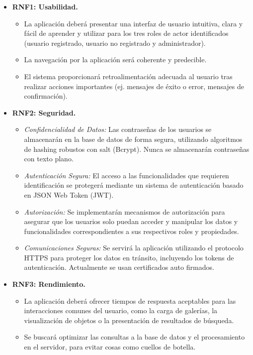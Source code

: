 \begin{itemize}
    \item \textbf{RNF1: Usabilidad.}
    \begin{itemize}
        \item La aplicación deberá presentar una interfaz de usuario intuitiva, clara y fácil de aprender y utilizar para los tres roles de actor identificados (usuario registrado, usuario no registrado y administrador).
        \item La navegación por la aplicación será coherente y predecible.
        \item El sistema proporcionará retroalimentación adecuada al usuario tras realizar acciones importantes (ej. mensajes de éxito o error, mensajes de confirmación).
    \end{itemize}
    \vspace{0.3cm}
    \item \textbf{RNF2: Seguridad.}
    \begin{itemize}
        \item \textit{Confidencialidad de Datos:} Las contraseñas de los usuarios se almacenarán en la base de datos de forma segura, utilizando algoritmos de hashing robustos con salt (Bcrypt). Nunca se almacenarán contraseñas con texto plano.
        \item \textit{Autenticación Segura:} El acceso a las funcionalidades que requieren identificación se protegerá mediante un sistema de autenticación basado en JSON Web Token (JWT).
        \item \textit{Autorización:} Se implementarán mecanismos de autorización para asegurar que los usuarios solo puedan acceder y manipular los datos y funcionalidades correspondientes a sus respectivos roles y propiedades.
        \item \textit{Comunicaciones Seguras:} Se servirá la aplicación utilizando el protocolo HTTPS para proteger los datos en tránsito, incluyendo los tokens de autenticación. Actualmente se usan certificados auto firmados.
    \end{itemize}
    \vspace{0.3cm}
    \item \textbf{RNF3: Rendimiento.}
    \begin{itemize}
        \item La aplicación deberá ofrecer tiempos de respuesta aceptables para las interacciones comunes del usuario, como la carga de galerías, la visualización de objetos o la presentación de resultados de búsqueda.
        \item Se buscará optimizar las consultas a la base de datos y el procesamiento en el servidor, para evitar cosas como cuellos de botella.

\end{itemize}
\end{itemize}
